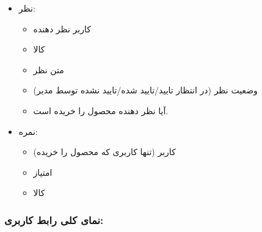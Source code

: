 \documentclass[]{article}
\begin{document}
\begin{itemize}
\begin{itemize}
\end{itemize}
\newpage
\item
نظر:

\begin{itemize}
\item
کاربر نظر دهنده

\item
کالا

\item
متن نظر

\item
وضعیت نظر (در انتظار تایید/تایید شده/تایید نشده توسط مدیر)

\item
آیا نظر دهنده محصول را خریده است.

\end{itemize}

\item
نمره:

\begin{itemize}

\item
کاربر (تنها کاربری که محصول را خریده)

\item
امتیاز

\item
کالا

\end{itemize}


\end{itemize}


\subsubsection*{{\titr نمای کلی رابط کاربری:}}
\end{document}

